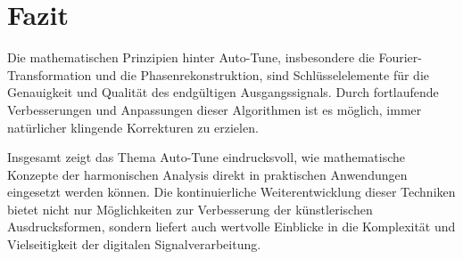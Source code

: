 %
%
%
%
\section{Fazit
\label{autotune:section:fazit}}
Die mathematischen Prinzipien hinter Auto-Tune, insbesondere die Fourier-Transformation und die Phasenrekonstruktion,
sind Schlüsselelemente für die Genauigkeit und Qualität des endgültigen Ausgangssignals.
Durch fortlaufende Verbesserungen und Anpassungen dieser Algorithmen ist es möglich, immer natürlicher klingende Korrekturen zu erzielen.

Insgesamt zeigt das Thema Auto-Tune eindrucksvoll, wie mathematische Konzepte der harmonischen Analysis direkt in praktischen Anwendungen eingesetzt werden können.
Die kontinuierliche Weiterentwicklung dieser Techniken bietet nicht nur Möglichkeiten zur Verbesserung der künstlerischen Ausdrucksformen,
sondern liefert auch wertvolle Einblicke in die Komplexität und Vielseitigkeit der digitalen Signalverarbeitung.

